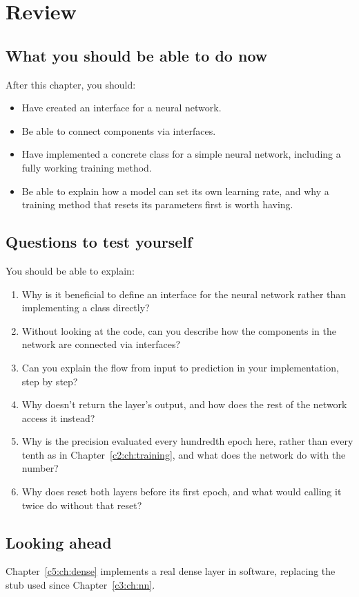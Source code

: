 
\section{Review}
\label{c4:sec:review}

\subsection*{What you should be able to do now}
After this chapter, you should:
\begin{itemize}
  \item Have created an interface for a neural network.
  \item Be able to connect components via interfaces.
  \item Have implemented a concrete class for a simple neural network, including a fully working
    training method.
  \item Be able to explain how a model can set its own learning rate, and why a training method
    that resets its parameters first is worth having.
\end{itemize}

\subsection*{Questions to test yourself}
You should be able to explain:
\begin{enumerate}
  \item Why is it beneficial to define an interface for the neural network rather than
    implementing a class directly?
  \item Without looking at the code, can you describe how the components in the network are
    connected via interfaces?
  \item Can you explain the flow from input to prediction in your implementation, step by step?
  \item Why doesn't  return the layer's output, and how does the rest of the
    network access it instead?
  \item Why is the precision evaluated every hundredth epoch here, rather than every tenth as in
    Chapter~\ref{c2:ch:training}, and what does the network do with the number?
  \item Why does  reset both layers before its first epoch, and what would calling it
    twice do without that reset?
\end{enumerate}

\subsection*{Looking ahead}
Chapter~\ref{c5:ch:dense} implements a real dense layer in software, replacing the stub used since
Chapter~\ref{c3:ch:nn}.
